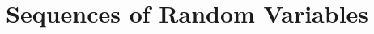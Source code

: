 \documentclass[a4paper, oneside]{book}
\begin{document}









\chapter{Sequences of Random Variables}
\end{document}
